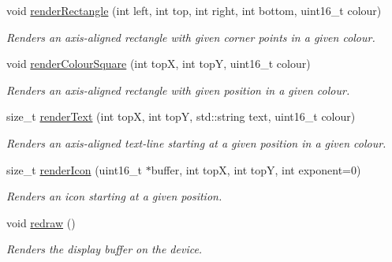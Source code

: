 \begin{DoxyCompactItemize}
void \mbox{\hyperlink{classDisplay_aeadae3356ab6ef6bc101dd5c3ee1317d}{render\+Rectangle}} (int left, int top, int right, int bottom, uint16\+\_\+t colour)
\begin{DoxyCompactList}\small\item\em Renders an axis-\/aligned rectangle with given corner points in a given colour. \end{DoxyCompactList}\item 
void \mbox{\hyperlink{classDisplay_a94ad8f357b5fffdd4711a593e29003a8}{render\+Colour\+Square}} (int topX, int topY, uint16\+\_\+t colour)
\begin{DoxyCompactList}\small\item\em Renders an axis-\/aligned rectangle with given position in a given colour. \end{DoxyCompactList}\item 
size\+\_\+t \mbox{\hyperlink{classDisplay_a0e1bcaa77e45765f710a28130a34473d}{render\+Text}} (int topX, int topY, std\+::string text, uint16\+\_\+t colour)
\begin{DoxyCompactList}\small\item\em Renders an axis-\/aligned text-\/line starting at a given position in a given colour. \end{DoxyCompactList}\item 
size\+\_\+t \mbox{\hyperlink{classDisplay_a7e1b0ac97b561093e8f1993d7743c095}{render\+Icon}} (uint16\+\_\+t $\ast$buffer, int topX, int topY, int exponent=0)
\begin{DoxyCompactList}\small\item\em Renders an icon starting at a given position. \end{DoxyCompactList}\item 
\mbox{\label{classDisplay_a4fe6059ab67f9a11469ea53f4a5ddb0d}} 
void \mbox{\hyperlink{classDisplay_a4fe6059ab67f9a11469ea53f4a5ddb0d}{redraw}} ()
\begin{DoxyCompactList}\small\item\em Renders the display buffer on the device. \end{DoxyCompactList}\end{DoxyCompactItemize}
